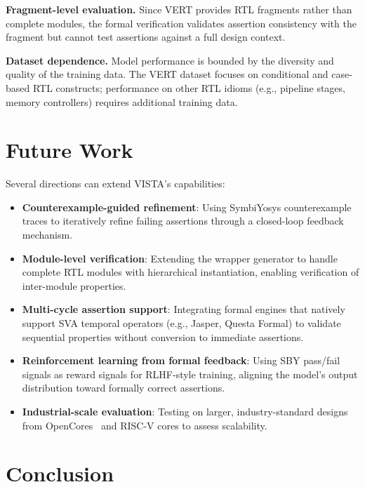 \documentclass[conference]{IEEEtran}
\begin{document}
\textbf{Fragment-level evaluation.}
Since VERT provides RTL fragments rather than complete modules, the formal verification validates assertion consistency with the fragment but cannot test assertions against a full design context.

\textbf{Dataset dependence.}
Model performance is bounded by the diversity and quality of the training data. The VERT dataset focuses on conditional and case-based RTL constructs; performance on other RTL idioms (e.g., pipeline stages, memory controllers) requires additional training data.

\section{Future Work}
\label{sec:future}

Several directions can extend VISTA's capabilities:

\begin{itemize}
    \item \textbf{Counterexample-guided refinement}: Using SymbiYosys counterexample traces to iteratively refine failing assertions through a closed-loop feedback mechanism.
    \item \textbf{Module-level verification}: Extending the wrapper generator to handle complete RTL modules with hierarchical instantiation, enabling verification of inter-module properties.
    \item \textbf{Multi-cycle assertion support}: Integrating formal engines that natively support SVA temporal operators (e.g., Jasper, Questa Formal) to validate sequential properties without conversion to immediate assertions.
    \item \textbf{Reinforcement learning from formal feedback}: Using SBY pass/fail signals as reward signals for RLHF-style training, aligning the model's output distribution toward formally correct assertions.
    \item \textbf{Industrial-scale evaluation}: Testing on larger, industry-standard designs from OpenCores~\cite{opencores} and RISC-V cores to assess scalability.
\end{itemize}

\section{Conclusion}
\label{sec:conclusion}
\end{document}
